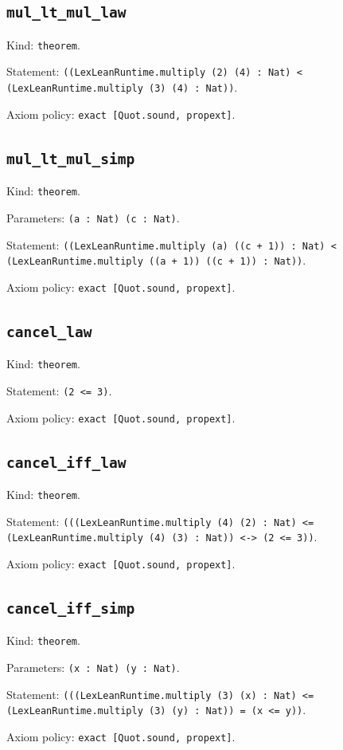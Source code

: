 \documentclass[11pt]{article}
\begin{document}
\subsection*{\texttt{mul\_lt\_mul\_law}}
\noindent Kind: \texttt{theorem}.\par
\noindent Statement: \texttt{((LexLeanRuntime.multiply (2) (4) : Nat) < (LexLeanRuntime.multiply (3) (4) : Nat))}.\par
\noindent Axiom policy: \texttt{exact [Quot.sound, propext]}.\par
\subsection*{\texttt{mul\_lt\_mul\_simp}}
\noindent Kind: \texttt{theorem}.\par
\noindent Parameters: \texttt{(a : Nat) (c : Nat)}.\par
\noindent Statement: \texttt{((LexLeanRuntime.multiply (a) ((c + 1)) : Nat) < (LexLeanRuntime.multiply ((a + 1)) ((c + 1)) : Nat))}.\par
\noindent Axiom policy: \texttt{exact [Quot.sound, propext]}.\par
\subsection*{\texttt{cancel\_law}}
\noindent Kind: \texttt{theorem}.\par
\noindent Statement: \texttt{(2 <= 3)}.\par
\noindent Axiom policy: \texttt{exact [Quot.sound, propext]}.\par
\subsection*{\texttt{cancel\_iff\_law}}
\noindent Kind: \texttt{theorem}.\par
\noindent Statement: \texttt{(((LexLeanRuntime.multiply (4) (2) : Nat) <= (LexLeanRuntime.multiply (4) (3) : Nat)) <-> (2 <= 3))}.\par
\noindent Axiom policy: \texttt{exact [Quot.sound, propext]}.\par
\subsection*{\texttt{cancel\_iff\_simp}}
\noindent Kind: \texttt{theorem}.\par
\noindent Parameters: \texttt{(x : Nat) (y : Nat)}.\par
\noindent Statement: \texttt{(((LexLeanRuntime.multiply (3) (x) : Nat) <= (LexLeanRuntime.multiply (3) (y) : Nat)) = (x <= y))}.\par
\noindent Axiom policy: \texttt{exact [Quot.sound, propext]}.\par
\end{document}
